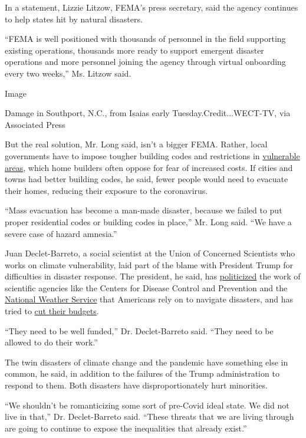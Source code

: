 In a statement, Lizzie Litzow, FEMA's press secretary, said the agency
continues to help states hit by natural disasters.

``FEMA is well positioned with thousands of personnel in the field
supporting existing operations, thousands more ready to support emergent
disaster operations and more personnel joining the agency through
virtual onboarding every two weeks,'' Ms. Litzow said.

Image

Damage in Southport, N.C., from Isaias early Tuesday.Credit...WECT-TV,
via Associated Press

But the real solution, Mr. Long said, isn't a bigger FEMA. Rather, local
governments have to impose tougher building codes and restrictions in
\href{https://www.bloomberg.com/news/articles/2018-11-14/california-s-wildfire-epidemic-blamed-on-bad-building-decisions?sref=UBrhZ1ro}{vulnerable
areas}, which home builders often oppose for fear of increased costs. If
cities and towns had better building codes, he said, fewer people would
need to evacuate their homes, reducing their exposure to the
coronavirus.

``Mass evacuation has become a man-made disaster, because we failed to
put proper residential codes or building codes in place,'' Mr. Long
said. ``We have a severe case of hazard amnesia.''

Juan Declet-Barreto, a social scientist at the Union of Concerned
Scientists who works on climate vulnerability, laid part of the blame
with President Trump for difficulties in disaster response. The
president, he said, has
\href{https://www.nytimes.com/2020/07/09/climate/trump-hurricane-dorian-noaa.html}{politicized}
the work of scientific agencies like the Centers for Disease Control and
Prevention and the
\href{https://www.nytimes.com/2019/09/13/climate/trump-noaa-hurricane-tweet.html}{National
Weather Service} that Americans rely on to navigate disasters, and has
tried to
\href{https://www.sciencemag.org/news/2020/02/trump-s-new-budget-cuts-all-favored-few-science-programs}{cut
their budgets}.

``They need to be well funded,'' Dr. Declet-Barreto said. ``They need to
be allowed to do their work.''

The twin disasters of climate change and the pandemic have something
else in common, he said, in addition to the failures of the Trump
administration to respond to them. Both disasters have
disproportionately hurt minorities.

``We shouldn't be romanticizing some sort of pre-Covid ideal state. We
did not live in that,'' Dr. Declet-Barreto said. ``These threats that we
are living through are going to continue to expose the inequalities that
already exist.''

